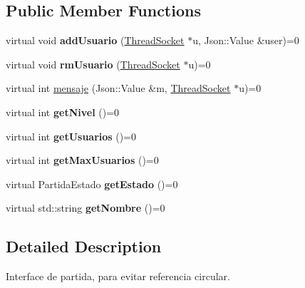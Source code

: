 \subsection*{Public Member Functions}
\begin{DoxyCompactItemize}
\item 
\hypertarget{classPartidaInterface_a1190634ccd9ce1b78a83ef0e68c67bc5}{virtual void {\bfseries add\-Usuario} (\hyperlink{classThreadSocket}{Thread\-Socket} $\ast$u, Json\-::\-Value \&user)=0}\label{classPartidaInterface_a1190634ccd9ce1b78a83ef0e68c67bc5}

\item 
\hypertarget{classPartidaInterface_a41823671d949f4c2b9abbaca3709ca63}{virtual void {\bfseries rm\-Usuario} (\hyperlink{classThreadSocket}{Thread\-Socket} $\ast$u)=0}\label{classPartidaInterface_a41823671d949f4c2b9abbaca3709ca63}

\item 
virtual int \hyperlink{classPartidaInterface_a72c79ab5c06e2ec804260dc98a977e60}{mensaje} (Json\-::\-Value \&m, \hyperlink{classThreadSocket}{Thread\-Socket} $\ast$u)=0
\item 
\hypertarget{classPartidaInterface_af3e878d3e1de9d64f17e12b32dcc7643}{virtual int {\bfseries get\-Nivel} ()=0}\label{classPartidaInterface_af3e878d3e1de9d64f17e12b32dcc7643}

\item 
\hypertarget{classPartidaInterface_a8788de756e14af6febdf8bd44f8ff02b}{virtual int {\bfseries get\-Usuarios} ()=0}\label{classPartidaInterface_a8788de756e14af6febdf8bd44f8ff02b}

\item 
\hypertarget{classPartidaInterface_aa3b96356d4b96b799900c9425da251ba}{virtual int {\bfseries get\-Max\-Usuarios} ()=0}\label{classPartidaInterface_aa3b96356d4b96b799900c9425da251ba}

\item 
\hypertarget{classPartidaInterface_ac6b479769dd8d53ced7e0cbc147ca4d5}{virtual Partida\-Estado {\bfseries get\-Estado} ()=0}\label{classPartidaInterface_ac6b479769dd8d53ced7e0cbc147ca4d5}

\item 
\hypertarget{classPartidaInterface_a0287b2294f48e9bbda0173df9544964c}{virtual std\-::string {\bfseries get\-Nombre} ()=0}\label{classPartidaInterface_a0287b2294f48e9bbda0173df9544964c}

\end{DoxyCompactItemize}


\subsection{Detailed Description}
Interface de partida, para evitar referencia circular. 

